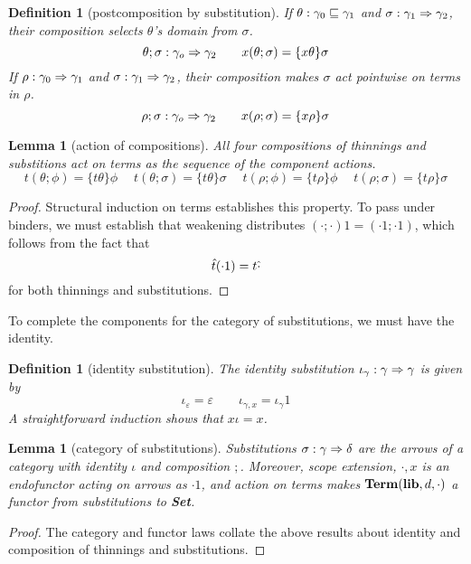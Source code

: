 \documentclass{jfp1}
\newtheorem{lemma}[theorem]{Lemma}
\newtheorem{definition}[theorem]{Definition}
\newcommand{\emp}{\varepsilon}
\newcommand{\grp}[1]{\{ #1 \}}
\begin{document}
\begin{definition}[postcomposition by substitution]
  If $\theta : \gamma_0\sqsubseteq\gamma_1$ and $\sigma : \gamma_1\Rightarrow\gamma_2$, their
  composition \emph{selects} $\theta$'s domain from $\sigma$.
  \[\theta;\sigma : \gamma_o\su\gamma_2\qquad x(\theta;\sigma) = \grp{x\theta}\sigma
  \]
  If $\rho : \gamma_0\Rightarrow\gamma_1$ and $\sigma : \gamma_1\Rightarrow\gamma_2$, their
  composition makes $\sigma$ act \emph{pointwise} on terms in $\rho$.
  \[\rho;\sigma : \gamma_o\su\gamma_2\qquad x(\rho;\sigma) = \grp{x\rho}\sigma
  \]
\end{definition}

\begin{lemma}[action of compositions]
  All four compositions of thinnings and substitions act on terms as the sequence of the
  component actions.
  \[
    t(\theta;\phi) = \grp{t\theta}\phi \quad\;
    t(\theta;\sigma) = \grp{t\theta}\sigma \quad\;
    t(\rho;\phi) = \grp{t\rho}\phi \quad\;
    t(\rho;\sigma) = \grp{t\rho}\sigma
  \]
\end{lemma}
\begin{proof}
  Structural induction on terms establishes this property. To pass under binders, we must
  establish that weakening distributes $(\cdot;\cdot)1 = (\cdot1;\cdot1)$, which follows from
  the fact that
  \[
    \hat t(\cdot1) = t\hat\cdot
  \]
  for both thinnings and substitutions.
\end{proof}

To complete the components for the category of substitutions, we must have the identity.
\newcommand{\isu}{\iota}
\begin{definition}[identity substitution]
  The identity substitution $\isu_\gamma : \gamma\su\gamma$ is given by
  \[\isu_\emp = \emp \qquad \isu_{\gamma,x} = \isu_\gamma1
  \]
  A straightforward induction shows that $x\isu = x$.
\end{definition}

\begin{lemma}[category of substitutions]
  Substitutions $\sigma : \gamma\Rightarrow\delta$ are the arrows of a category with identity $\isu$
  and composition $;$. Moreover, scope extension, $\cdot,x$ is an endofunctor acting
  on arrows as $\cdot1$, and action on terms makes $\mathbf{Term}(\textbf{lib},d,\cdot)$ a functor
  from substitutions to \textbf{Set}.
\end{lemma}
\begin{proof}
  The category and functor laws collate the above results about identity and composition
  of thinnings and substitutions.
\end{proof}
\end{document}
